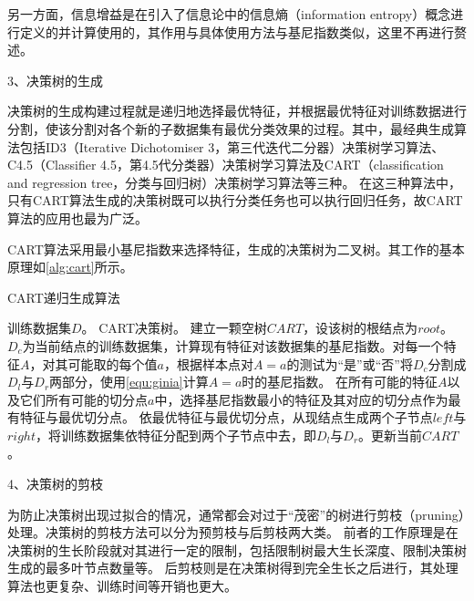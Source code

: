 另一方面，信息增益是在引入了信息论中的信息熵（information entropy）概念进行定义的并计算使用的，其作用与具体使用方法与基尼指数类似，这里不再进行赘述\cite{Zhou2016,Li2017}。

3、决策树的生成

决策树的生成构建过程就是递归地选择最优特征，并根据最优特征对训练数据进行分割，使该分割对各个新的子数据集有最优分类效果的过程。其中，最经典生成算法包括ID3（Iterative Dichotomiser 3，第三代迭代二分器）决策树学习算法、
C4.5（Classifier 4.5，第4.5代分类器）决策树学习算法及CART（classification and regression tree，分类与回归树）决策树学习算法等三种\cite{quinlan1986,quinlan1993,breiman1984}。
在这三种算法中，只有CART算法生成的决策树既可以执行分类任务也可以执行回归任务，故CART算法的应用也最为广泛。

CART算法采用最小基尼指数来选择特征，生成的决策树为二叉树。其工作的基本原理如\autoref{alg:cart}所示。
\begin{breakablealgorithm}
      \caption[CART生成算法]{CART递归生成算法\cite{Li2017}}
      \label{alg:cart}
      \begin{algorithmic}[1] %
            \Require 训练数据集$D$。
            \Ensure CART决策树。
            \State 建立一颗空树$CART$，设该树的根结点为$root$。
                  \State $D_c$为当前结点的训练数据集，计算现有特征对该数据集的基尼指数。对每一个特征$A$，对其可能取的每个值$a$，根据样本点对$A=a$的测试为“是”或“否”将$D_c$分割成$D_l$与$D_r$两部分，使用\autoref{equ:ginia}计算$A=a$时的基尼指数。
                  \State 在所有可能的特征$A$以及它们所有可能的切分点$a$中，选择基尼指数最小的特征及其对应的切分点作为最有特征与最优切分点。
                  \State 依最优特征与最优切分点，从现结点生成两个子节点$left$与$right$，将训练数据集依特征分配到两个子节点中去，即$D_l$与$D_r$。更新当前$CART$。
                  \State {}
                  \Else    
                  \State {}
                  \State {}
                  \EndIf
            \EndFunction
      \end{algorithmic}
\end{breakablealgorithm}

4、决策树的剪枝

为防止决策树出现过拟合的情况，通常都会对过于“茂密”的树进行剪枝（pruning）处理。决策树的剪枝方法可以分为预剪枝与后剪枝两大类。
前者的工作原理是在决策树的生长阶段就对其进行一定的限制，包括限制树最大生长深度、限制决策树生成的最多叶节点数量等。
后剪枝则是在决策树得到完全生长之后进行，其处理算法也更复杂、训练时间等开销也更大\cite{Zhou2016,Liu2018}。


